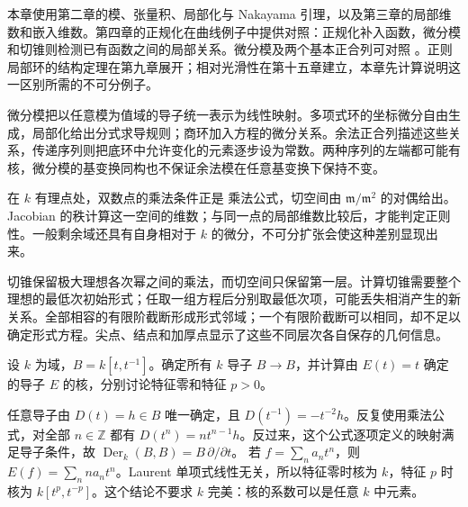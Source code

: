 \ProseParagraphBreak

本章使用第二章的模、张量积、局部化与 Nakayama 引理，以及第三章的局部维数和嵌入维数。第四章的正规化在曲线例子中提供对照：正规化补入函数，微分模和切锥则检测已有函数之间的局部关系。微分模及两个基本正合列可对照 \cite[第25节，第190—196页]{Matsumura1989}。正则局部环的结构定理在第九章展开；相对光滑性在第十五章建立，本章先计算说明这一区别所需的不可分例子。






\begin{chaptersummary}
	微分模把以任意模为值域的导子统一表示为线性映射。多项式环的坐标微分自由生成，局部化给出分式求导规则；商环加入方程的微分关系。余法正合列描述这些关系，传递序列则把底环中允许变化的元素逐步设为常数。两种序列的左端都可能有核，微分模的基变换同构也不保证余法模在任意基变换下保持不变。

	\ProseParagraphBreak

	在 \(k\) 有理点处，双数点的乘法条件正是 乘法公式，切空间由 \(\mathfrak m/\mathfrak m^2\) 的对偶给出。Jacobian 的秩计算这一空间的维数；与同一点的局部维数比较后，才能判定正则性。一般剩余域还具有自身相对于 \(k\) 的微分，不可分扩张会使这种差别显现出来。

	\ProseParagraphBreak

	切锥保留极大理想各次幂之间的乘法，而切空间只保留第一层。计算切锥需要整个理想的最低次初始形式；任取一组方程后分别取最低次项，可能丢失相消产生的新关系。全部相容的有限阶截断形成形式邻域；一个有限阶截断可以相同，却不足以确定形式方程。尖点、结点和加厚点显示了这些不同层次各自保存的几何信息。
\end{chaptersummary}

\BookExercises

\begin{exercise}\label{g5:ex:laurent-derivations}
	设 \(k\) 为域，\(B=k[t,t^{-1}]\)。确定所有 \(k\) 导子 \(B\to B\)，并计算由 \(E(t)=t\) 确定的导子 \(E\) 的核，分别讨论特征零和特征 \(p>0\)。
\end{exercise}
\begin{solution}
	任意导子由 \(D(t)=h\in B\) 唯一确定，且
	\(D(t^{-1})=-t^{-2}h\)。反复使用乘法公式，对全部 \(n\in\mathbb Z\) 都有
	\(D(t^n)=nt^{n-1}h\)。反过来，这个公式逐项定义的映射满足导子条件，故
	\(\operatorname{Der}_k(B,B)=B\,\partial/\partial t\)。
	若 \(f=\sum_n a_nt^n\)，则 \(E(f)=\sum_n na_nt^n\)。Laurent 单项式线性无关，所以特征零时核为 \(k\)，特征 \(p\) 时核为 \(k[t^p,t^{-p}]\)。这个结论不要求 \(k\) 完美：核的系数可以是任意 \(k\) 中元素。
\end{solution}

